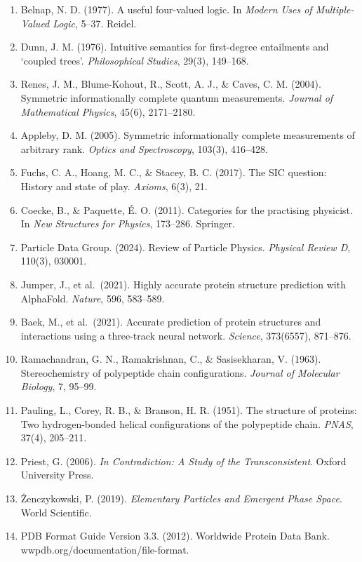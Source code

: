 \begin{enumerate}
\def\labelenumi{\arabic{enumi}.}
\item
  Belnap, N. D. (1977). A useful four-valued logic. In \emph{Modern Uses
  of Multiple-Valued Logic}, 5--37. Reidel.
\item
  Dunn, J. M. (1976). Intuitive semantics for first-degree entailments
  and `coupled trees'. \emph{Philosophical Studies}, 29(3), 149--168.
\item
  Renes, J. M., Blume-Kohout, R., Scott, A. J., \& Caves, C. M. (2004).
  Symmetric informationally complete quantum measurements. \emph{Journal
  of Mathematical Physics}, 45(6), 2171--2180.
\item
  Appleby, D. M. (2005). Symmetric informationally complete measurements
  of arbitrary rank. \emph{Optics and Spectroscopy}, 103(3), 416--428.
\item
  Fuchs, C. A., Hoang, M. C., \& Stacey, B. C. (2017). The SIC question:
  History and state of play. \emph{Axioms}, 6(3), 21.
\item
  Coecke, B., \& Paquette, É. O. (2011). Categories for the practising
  physicist. In \emph{New Structures for Physics}, 173--286. Springer.
\item
  Particle Data Group. (2024). Review of Particle Physics.
  \emph{Physical Review D}, 110(3), 030001.
\item
  Jumper, J., et al.~(2021). Highly accurate protein structure
  prediction with AlphaFold. \emph{Nature}, 596, 583--589.
\item
  Baek, M., et al.~(2021). Accurate prediction of protein structures and
  interactions using a three-track neural network. \emph{Science},
  373(6557), 871--876.
\item
  Ramachandran, G. N., Ramakrishnan, C., \& Sasisekharan, V. (1963).
  Stereochemistry of polypeptide chain configurations. \emph{Journal of
  Molecular Biology}, 7, 95--99.
\item
  Pauling, L., Corey, R. B., \& Branson, H. R. (1951). The structure of
  proteins: Two hydrogen-bonded helical configurations of the
  polypeptide chain. \emph{PNAS}, 37(4), 205--211.
\item
  Priest, G. (2006). \emph{In Contradiction: A Study of the
  Transconsistent}. Oxford University Press.
\item
  Żenczykowski, P. (2019). \emph{Elementary Particles and Emergent Phase
  Space}. World Scientific.
\item
  PDB Format Guide Version 3.3. (2012). Worldwide Protein Data Bank.
  wwpdb.org/documentation/file-format.
\end{enumerate}

